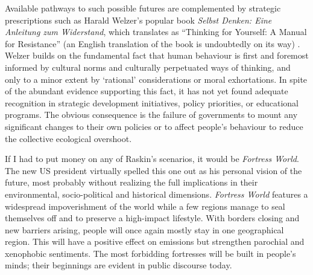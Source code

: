 \documentclass[10pt,a4paper]{article}
\begin{document}
\begin{multicols}{2}

Available pathways to such possible futures are complemented by strategic prescriptions such as Harald Welzer's popular book \textit{Selbst Denken: Eine Anleitung zum Widerstand}, which translates as ``Thinking for Yourself: A Manual for Resistance'' (an English translation of the book is undoubtedly on its way) \citep{r04}. Welzer builds on the fundamental fact that human behaviour is first and foremost informed by cultural norms and culturally perpetuated ways of thinking, and only to a minor extent by `rational' considerations or moral exhortations. In spite of the abundant evidence supporting this fact, it has not yet found adequate recognition in strategic development initiatives, policy priorities, or educational programs. The obvious consequence is the failure of governments to mount any significant changes to their own policies or to affect people's behaviour to reduce the collective ecological overshoot.

If I had to put money on any of Raskin's scenarios, it would be \textit{Fortress World}. The new US president virtually spelled this one out as his personal vision of the future, most probably without realizing the full implications in their environmental, socio-political and historical dimensions. \textit{Fortress World} features a widespread impoverishment of the world while a few regions manage to seal themselves off and to preserve a high-impact lifestyle. With borders closing and new barriers arising, people will once again mostly stay in one geographical region. This will have a positive effect on emissions but strengthen parochial and xenophobic sentiments. The most forbidding fortresses will be built in people's minds; their beginnings are evident in public discourse today.


\end{multicols}
\end{document}
